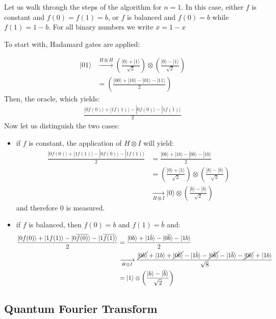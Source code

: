 \documentclass{article}
\begin{document}
Let us walk through the steps of the algorithm for $n=1$.
In this case, either $f$ is constant and $f(0)=f(1)=b$, 
or $f$ is balanced and $f(0)=b$ while $f(1)=1-b$.
For all binary numbers we write $\overline{x}=1-x$

To start with, Hadamard gates are applied:

\begin{align*}
    |01\rangle &\xrightarrow{H\otimes H} \left(\frac{|0\rangle+|1\rangle}{\sqrt{2}}\right)\otimes \left(\frac{|0\rangle-|1\rangle}{\sqrt{2}}\right)\\
    &= \left(\frac{|00\rangle+|10\rangle-|01\rangle-|11\rangle}{2}\right)
\end{align*}
Then, the oracle, which yields:
\begin{align*}
\frac{|0f(0)\rangle+|1f(1)\rangle-|0\overline{f(0)}\rangle-|1\overline{f(1)}\rangle}{2}
\end{align*}
Now let us distinguish the two cases:
\begin{itemize}
    \item if $f$ is constant, the application of $H\otimes I$ will yield:
\begin{align*}
\frac{|0f(0)\rangle+|1f(1)\rangle-|0\overline{f(0)}\rangle-|1\overline{f(1)}\rangle}{2}
&=\frac{|0b\rangle+|1b\rangle-|0\overline{b}\rangle-|1\overline{b}\rangle}{2}\\
&=\left(\frac{|0\rangle+|1\rangle}{\sqrt{2}}\right)\otimes \left(\frac{|b\rangle-|\overline{b}\rangle}{\sqrt{2}}\right)\\
&\xrightarrow[H\otimes I]{} |0\rangle \otimes \left(\frac{|b\rangle-|\overline{b}\rangle}{\sqrt{2}}\right)
\end{align*}
and therefore $0$ is measured.
\item if $f$ is balanced, then $f(0)=b$ and $f(1)=\overline{b}$ and:
\begin{align*}
\frac{|0f(0)\rangle+|1f(1)\rangle-|0\overline{f(0)}\rangle-|1\overline{f(1)}\rangle}{2}
&=\frac{|0b\rangle+|1\bar{b}\rangle-|0\overline{b}\rangle-|1b\rangle}{2}\\
&\xrightarrow[H\otimes I]{}
    \frac{\cancel{|0b\rangle}+|1b\rangle+\cancel{|0\bar{b}\rangle}-|1\bar{b}\rangle-\cancel{|0\overline{b}\rangle}-|1\overline{b}\rangle-\cancel{|0b\rangle}+|1b\rangle}{\sqrt{8}}\\
&= |1\rangle\otimes\left(\frac{|b\rangle-|\overline{b}\rangle}{\sqrt{2}}\right)
\end{align*}
\end{itemize}
\subsection{Quantum Fourier Transform}
\end{document}
